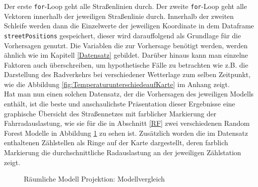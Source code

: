 \documentclass[a4paper,12pt]{thesis}
\begin{document}
Der erste \lstinline|for|-Loop geht alle Straßenlinien durch. Der zweite \lstinline|for|-Loop geht alle Vektoren innerhalb der jeweiligen Straßenlinie durch. Innerhalb der zweiten Schleife werden dann die Einzelwerte der jeweiligen Koordinate in dem Dataframe \lstinline|streetPositions| gespeichert, dieser wird darauffolgend als Grundlage für die Vorhersagen genutzt. Die Variablen die zur Vorhersage benötigt werden, werden ähnlich wie im Kapitell \ref{Datensatz} gebildet. Darüber hinaus kann man einzelne Faktoren auch überschreiben, um hypothetische Fälle zu betrachten wie z.B. die Darstellung des Radverkehrs bei verschiedener Wetterlage zum selben Zeitpunkt, wie die Abbildung \ref{fig:TemperaturunterschiedeaufKarte} im Anhang zeigt.\\
Hat man nun einen solchen Datensatz, der die Vorhersagen des jeweiligen Modells enthält, ist die beste und anschaulichste Präsentation dieser Ergebnisse eine graphische Übersicht des Straßennetzes mit farblicher Markierung der Fahrradauslastung, wie sie für die in Abschnitt \ref{RF} zwei verschiedenen Random Forest Modelle in Abbildung \ref{fig:MunsterRing} zu sehen ist. Zusätzlich worden die im Datensatz enthaltenen Zählstellen als Ringe auf der Karte dargestellt, deren farblich Markierung die durchschnittliche Radauslastung an der jeweiligen Zählstation zeigt.

\begin{figure}%
	\centering

	\caption{Räumliche Modell Projektion: Modellvergleich}%
	\label{fig:MunsterRing}%
\end{figure}
\end{document}
